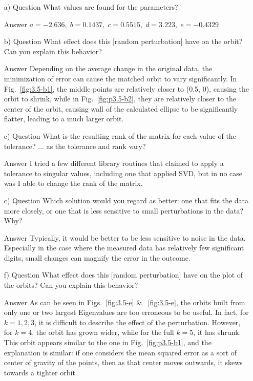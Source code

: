 \documentclass[paper=a4, fontsize=11pt]{scrartcl}
\numberwithin{equation}{section}		%
\numberwithin{figure}{section}			%
\numberwithin{table}{section}				%
\begin{document}
\begin{enumerate}[(a)]
	\item[a) Question] What values are found for the parameters? \vspace{-2mm}
		\item[Answer] $a=-2.636, \; b=0.1437, \; c=0.5515, \; d=3.223, \; e=-0.4329$
	\item[b) Question] What effect does this [random perturbation] have on the orbit? Can you explain this behavior? \vspace{-2mm}
		\item[Answer] Depending on the average change in the original data, the minimization of error can cause the matched orbit to vary significantly. In  Fig.~\ref{fig:3.5-b1}, the middle points are relatively closer to (0.5, 0), causing the orbit to shrink, while in Fig.~\ref{fig:p3.5-b2}, they are relatively closer to the center of the orbit, causing wall of the calculated ellipse to be significantly flatter, leading to a much larger orbit.
	\item[c) Question] What is the resulting rank of the matrix for each value of the tolerance? ... as the tolerance and rank vary? \vspace{-2mm}
		\item[Answer] I tried a few different library routines that claimed to apply a tolerance to singular values, including one that applied SVD, but in no case was I able to change the rank of the matrix.
	\item[c) Question] Which solution would you regard as better: one that fits the data more closely, or one that is less sensitive to small perturbations in the data? Why? \vspace{-2mm}
		\item[Answer] Typically, it would be better to be less sensitive to noise in the data. Especially in the case where the measured data has relatively few significant digits, small changes can magnify the error in the outcome.
	\item[f) Question] What effect does this [random perturbation] have on the plot of the orbits? Can you explain this behavior? \vspace{-2mm}
		\item[Answer] As can be seen in Figs.~\ref{fig:3.5-e} \& ~\ref{fig:3.5-e}, the orbits built from only one or two largest Eigenvalues are too erroneous to be useful. In fact, for $k={1, 2, 3}$, it is difficult to describe the effect of the perturbation. However, for $k=4$, the orbit has grown wider, while for the full $k=5$, it has shrunk. This orbit appears similar to the one in Fig.~\ref{fig:p3.5-b1}, and the explanation is similar: if one considers the mean squared error as a sort of center of gravity of the points, then as that center moves outwards, it skews towards a tighter orbit.

\end{enumerate}
\end{document}
